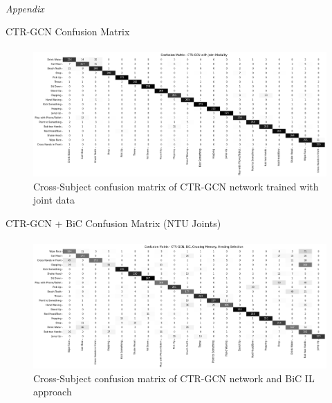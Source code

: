 \documentclass[aspectratio=169, xcolor=dvipsnames]{beamer}
\begin{document}
\appendix

\begin{frame}
      \framesubtitle{}%
      
      \vspace{1.25cm}
      \centering
      \Huge
      \emph{Appendix}\\
\end{frame}

\begin{frame}{CTR-GCN Confusion Matrix}
      \framesubtitle{}%
      
      \begin{figure}[ht!]
            \centering
            \includegraphics[width=\textwidth]{images/cf_ctr_jnt_cs.png}
            \caption{Cross-Subject confusion matrix of CTR-GCN network trained with joint data}
      \end{figure}
\end{frame}

\begin{frame}{CTR-GCN + BiC Confusion Matrix (NTU Joints)}
      \framesubtitle{}%
      
      \begin{figure}[ht!]
            \centering
            \includegraphics[width=\textwidth]{images/cf_ctr_bic_cs.png}
            \caption{Cross-Subject confusion matrix of CTR-GCN network and BiC IL approach}
      \end{figure}
\end{frame}
\end{document}

